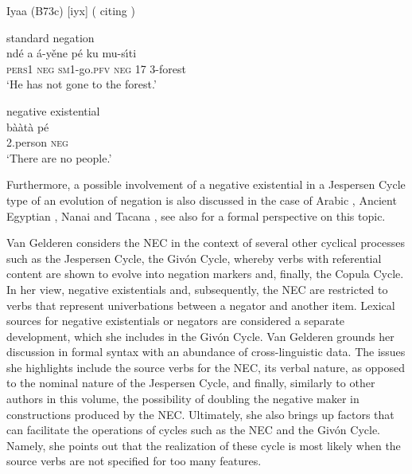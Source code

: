 \documentclass[output=paper,chinesefont,colorlinks,citecolor=brown]{langscibook}
\begin{document}
\begin{exe}
\ex Iyaa (B73c) [iyx] ( citing  \citet[439, 436]{Mouandza2001}) \label{ex:iyaa1}
\begin{xlist}
\ex standard negation \label{ex:iyaa1a}\\
\gll ndé a á-yěne pé ku mu-s{\'\i}ti\\
	\textsc{pers}1 \textsc{neg} \textsc{sm}1-go.\textsc{pfv} \textsc{neg} 17 3-forest\\
\glt `He has not gone to the forest.' 

\ex negative existential \label{ex:iyaa1b}\\
\gll b{\`a\`a}t\`a pé\\
	2.person \textsc{neg}\\
\glt `There are no people.'
\end{xlist}
\end{exe}
 Furthermore, a possible involvement of a negative existential in a Jespersen Cycle type of an evolution of negation is also discussed in the case of Arabic , Ancient Egyptian , Nanai  and Tacana , see also  for a formal perspective on this topic.
  
 Van Gelderen considers the NEC in the context of several other cyclical processes such as the Jespersen Cycle, the Givón Cycle, whereby verbs with referential content are shown to evolve into negation markers and, finally, the Copula Cycle. In her view, negative existentials and, subsequently, the NEC are restricted to verbs that represent univerbations between a negator and another item. Lexical sources for negative existentials or negators are considered a separate development, which she includes in the Givón Cycle. Van Gelderen grounds her discussion in formal syntax with an abundance of cross-linguistic data. The issues she highlights include the source verbs for the NEC, its verbal nature, as opposed to the nominal nature of the Jespersen Cycle, and finally, similarly to other authors in this volume, the possibility of doubling the negative maker in constructions produced by the NEC. Ultimately, she also brings up factors that can facilitate the operations of cycles such as the NEC and the Givón Cycle. Namely, she points out that the realization of these cycle is most likely when the source verbs are not specified for too many features.
 
\end{document}
